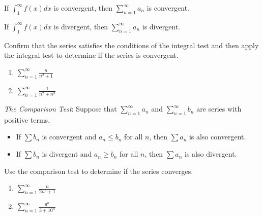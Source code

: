 \documentclass[12 pt]{article}
\begin{document}
If ${\displaystyle \int_{1}^{\infty} f(x) dx}$ is convergent, then ${\displaystyle \sum_{n=1}^{\infty} a_{n}}$ is convergent. 

If ${\displaystyle \int_{1}^{\infty} f(x) dx}$ is divergent, then ${\displaystyle \sum_{n=1}^{\infty} a_{n}}$ is divergent. 

Confirm that the series satisfies the conditions of the integral test and then apply the integral test to determine if the series is convergent. 

\begin{enumerate}

\item ${\displaystyle \sum_{n=1}^{\infty} \frac{n}{n^2+1}}$


\item ${\displaystyle \sum_{n=1}^{\infty} \frac{1}{n^2+n^3}}$




\end{enumerate}

\newpage

\textit{The Comparison Test}: Suppose that ${\displaystyle \sum_{n=1}^{\infty} a_{n}}$ and ${\displaystyle \sum_{n=1}^{\infty} b_{n}}$ are series with positive terms. 

\begin{itemize}

\item If $\sum b_{n}$ is convergent and $a_{n} \leq b_{n}$ for all $n$, then $\sum a_{n}$ is also convergent. 

\item If $\sum b_{n}$ is divergent and $a_{n} \geq b_{n}$ for all $n$, then $\sum a_{n}$ is also divergent. 

\end{itemize}
 
Use the comparison test to determine if the series converges. 

\begin{enumerate}

\item ${\displaystyle \sum_{n=1}^{\infty} \frac{n}{2n^3+1}}$


\item ${\displaystyle \sum_{n=1}^{\infty} \frac{9^n}{3+10^n}}$




\end{enumerate}
\end{document}
